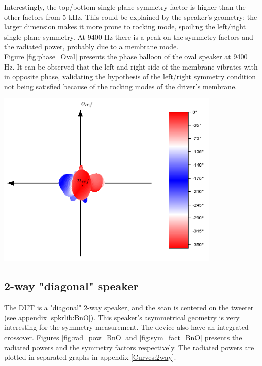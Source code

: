 \documentclass{report}
\begin{document}
\begin{minipage}{0.5\textwidth}
Interestingly, the top/bottom single plane symmetry factor is higher than the other factors from 5 kHz. This could be explained by the speaker's geometry: the larger dimension makes it more prone to rocking mode, spoiling the left/right single plane symmetry. At 9400 Hz there is a peak on the symmetry factors and the radiated power, probably due to a membrane mode.\\

Figure \ref{fig:phase_Oval} presents the phase balloon of the oval speaker at 9400 Hz. It can be observed that the left and right side of the membrane vibrates with in opposite phase, validating the hypothesis of the left/right symmetry condition not being satisfied because of the rocking modes of the driver's membrane. 
\end{minipage}
\begin{minipage}{0.5\textwidth}
\begin{center}
	\includegraphics[width=0.8\textwidth]{Sym/phase_oval} 
    \captionsetup{hypcap=false} 
	\label{fig:phase_Oval}
\end{center}
\end{minipage}

\newpage

\subsection{2-way "diagonal" speaker}

The DUT is a "diagonal" 2-way speaker, and the scan is centered on the tweeter (see appendix \ref{spkrlib:BnO}). This speaker's asymmetrical geometry is very interesting for the symmetry measurement. The device also have an integrated crossover. Figures \ref{fig:rad_pow_BnO} and \ref{fig:sym_fact_BnO} presents the radiated powers and the symmetry factors respectively. The radiated powers are plotted in separated graphs in appendix \ref{Curves:2way}. \\
\end{document}
